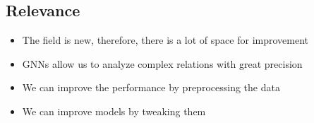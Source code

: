 \subsection{Relevance}
\begin{frame}{\subsecname}
	\begin{itemize}
		\item The field is new, therefore, there is a lot of space for improvement
		\item GNNs allow us to analyze complex relations with great precision
		\item We can improve the performance by preprocessing the data
		\item We can improve models by tweaking them
	\end{itemize}
\end{frame}

